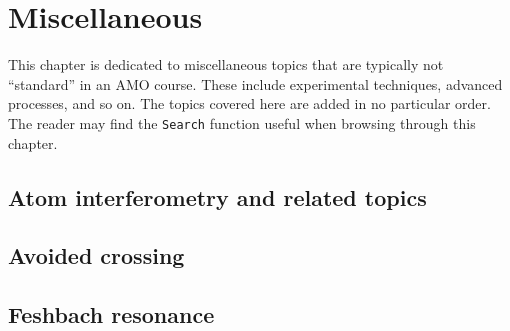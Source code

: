 \documentclass{book}
\theoremstyle{definition}
\begin{document}




\chapter{Miscellaneous}

This chapter is dedicated to miscellaneous topics that are typically not ``standard'' in an AMO course. These include experimental techniques, advanced processes, and so on. The topics covered here are added in no particular order. The reader may find the \texttt{Search} function useful when browsing through this chapter. 

\section{Atom interferometry and related topics}

\section{Avoided crossing}

\section{Feshbach resonance}











 




	
	
\end{document}
